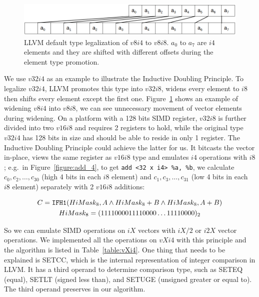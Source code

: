 \begin{figure}[ht!]
\centering
\includegraphics[width=130mm]{draw/v8i4_v8i8.png}
\caption[LLVM default type legalization of $v8i4$ to $v8i8$.]{LLVM default type legalization of $v8i4$ to $v8i8$. $a_0$ to $a_7$ are $i4$ elements and they are shifted with different offsets during the element type promotion.}
\label{figure:v8i4_v8i8}
\end{figure}

We use $v32i4$ as an example to illustrate the Inductive Doubling Principle. To legalize $v32i4$, LLVM promotes this type into $v32i8$, widens every element to $i8$ then shifts every element except the first one. Figure~\ref{figure:v8i4_v8i8} shows an example of widening $v8i4$ into $v8i8$, we can see unnecessary movement of vector elements during widening. On a platform with a 128 bits SIMD register, $v32i8$ is further divided into two $v16i8$ and requires 2 registers to hold, while the original type $v32i4$ has 128 bits in size and should be able to reside in only 1 register. The Inductive Doubling Principle could achieve the latter for us. It bitcasts the vector in-place, views the same register as $v16i8$ type and emulates $i4$ operations with $i8$; e.g.\ in Figure~\ref{figure:add_4}, to get \verb|add <32 x i4> %a, %b|, we calculate $c_0, c_2, \ldots, c_{30}$ (high 4 bits in each $i8$ element) and $c_1, c_3, \ldots, c_{31}$ (low 4 bits in each $i8$ element) separately with 2 $v16i8$ additions:

\begin{gather}
C = \text{\tt IFH1}(HiMask_8, A \land HiMask_8 + B \land HiMask_8, A + B) \\
HiMask_8 = (1111000011110000 \ldots 11110000)_2
\end{gather}

So we can emulate SIMD operations on $iX$ vectors with $iX/2$ or $i2X$ vector operations. We implemented all the operations on $vXi4$ with this principle and the algorithm is listed in Table~\ref{table:vXi4}. One thing that needs to be explained is SETCC, which is the internal representation of integer comparison in LLVM\@. It has a third operand to determine comparison type, such as SETEQ (equal), SETLT (signed less than), and SETUGE (unsigned greater or equal to). The third operand preserves in our algorithm.

